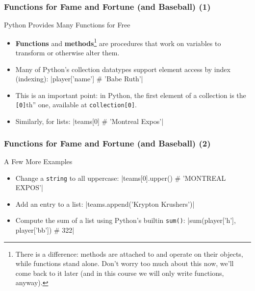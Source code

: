 \documentclass[10pt]{beamer}
\begin{document}
\begin{frame}[fragile]
  \frametitle{Functions for Fame and Fortune (and Baseball) (1)}
  \begin{block}{Python Provides Many Functions for Free}
    \begin{itemize}
      \item \textbf{Functions} and \textbf{methods}\footnote{There is a difference: methods are attached to and operate on their objects, while functions stand alone. Don't worry too much about this now, we'll come back to it later (and in this course we will only write functions, anyway).} are procedures that work on variables to transform or otherwise alter them.
      \item Many of Python's collection datatypes support element access by index (indexing):
        |player['name'] # 'Babe Ruth'|

      \item This is an important point: in Python, the first element of a collection is the \texttt{[0]}th'' one, available at \texttt{collection[0]}.
      \item Similarly, for lists:
        |teams[0] # 'Montreal Expos'|
    \end{itemize}
  \end{block}
\end{frame}

\begin{frame}[fragile]
  \frametitle{Functions for Fame and Fortune (and Baseball) (2)}
  \begin{block}{A Few More Examples}
    \begin{itemize}
      \item Change a \texttt{string} to all uppercase:
        |teams[0].upper() # 'MONTREAL EXPOS'|
      \item Add an entry to a list:
        |teams.append('Krypton Krushers')|
      \item Compute the sum of a list using Python's builtin \texttt{sum()}:
        |sum(player['h'], player['bb']) # 322|
    \end{itemize}
  \end{block}
\end{frame}
\end{document}
